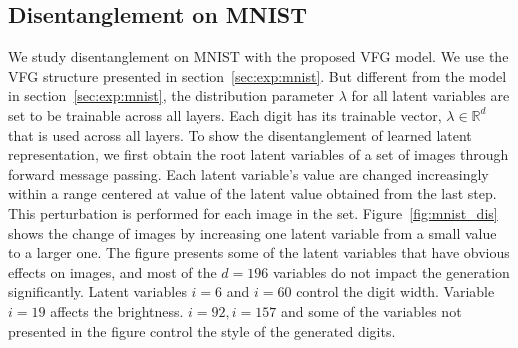 \documentclass[twoside]{article}
\begin{document}
\subsection{Disentanglement on MNIST}
We study disentanglement on MNIST with the proposed VFG model. We use the VFG structure presented in section~\ref{sec:exp:mnist}. But different from the model in section~\ref{sec:exp:mnist}, the distribution parameter $\lambda$ for all latent variables are set to be trainable across all layers.  Each digit has its trainable vector,  $\lambda \in \mathbb{R}^d$ that is used across all layers. 
To show the disentanglement of learned latent representation, we first obtain the root latent variables of a set of images through forward message passing. Each latent variable's value are changed increasingly within a range centered at value of the latent value obtained from the last step. 
This perturbation is performed for each image in the set.
Figure~\ref{fig:mnist_dis} shows the change of images by increasing one latent variable from a small value to a larger one. The figure presents some of the latent variables that have obvious effects on images, and most of the $d=196$ variables do not impact the generation significantly. Latent variables $i=6$ and $i=60$ control the digit width. Variable $i=19$ affects the brightness.  $i=92, i=157$ and some of the variables not presented in the figure  control the style of the generated digits. 
\end{document}
